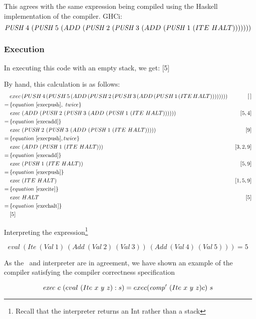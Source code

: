 \documentclass {article}
\begin{document}
This agrees with the same expression being compiled
using the Haskell implementation of the compiler.
GHCi:
\[ \PUSH 4\ (\PUSH 5\
	(ADD\ (\PUSH 2\ (\PUSH 3\ 
		(ADD\ (\PUSH 1\ (ITE\ HALT))))))) \]
	
\subsubsection{Execution}

In executing this code with an empty stack, we get: [5]

By hand, this calculation is as follows:
\begin{align*}
	&exec \, (PUSH \, 4\, (PUSH \, 5\, 
			(ADD\, (PUSH \, 2\, (PUSH \, 3\, 
			(ADD\, (PUSH \, 1\, (ITE\, HALT))))))))\ &[\, ] \\
	=\, & \{equation\ \ref{execpush},\ twice\} \\ 
	&\Exec (ADD\ (\PUSH 2\ (\PUSH 3\ 
			(ADD\ (\PUSH 1\ (ITE\ HALT))))))\ &[5,4] \\
	=\, & \{equation\ \ref{execadd}\} \\
	&\Exec (\PUSH 2\ (\PUSH 3\ 
			(ADD\ (\PUSH 1\ (ITE\ HALT)))))\ &[9] \\
	=\, & \{equation\ \ref{execpush}, twice\} \\ 
	&\Exec (ADD\ (\PUSH 1\ (ITE\ HALT)))\ &[3, 2, 9] \\
	=\, & \{equation\ \ref{execadd}\} \\
	&\Exec (\PUSH 1\ (ITE\ HALT))\ &[5, 9] \\
	=\, & \{equation\ \ref{execpush}\} \\
	&\Exec (ITE\ HALT) &[1, 5, 9] \\
	=\, & \{equation\ \ref{execite}\} \\
	&\Exec HALT\ &[5] \\
	=\, & \{equation\ \ref{exechalt}\} \\
	&[5]
\end{align*}

Interpreting the expression\footnote{
Recall that the interpreter returns an Int rather than a stack}

	\[ eval\ (Ite\ (Val\ 1)\ (Add\ (Val\ 2)\ (Val\ 3))\ (Add\ (Val\ 4)\ (Val\ 5))) = 5\]

As the \vm\ and interpreter are in agreement,
we have shown an example of the compiler 
satisfying the compiler correctness specification

\[ \mathit{exec\ } c\ (eval\ (Ite\ x\ y\ z):s) 
	= exec (\mathit{comp'\ }  (Ite\ x\ y\ z) c)\ s  \]
\end{document}
